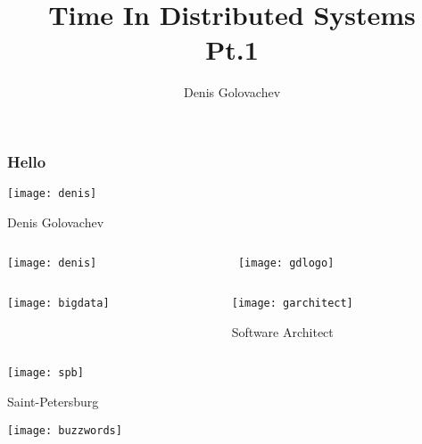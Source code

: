 \documentclass[aspectratio=169, 15pt,usenames,dvipsnames]{beamer}
\title{Time In Distributed Systems\\Pt.1}
\author{Denis Golovachev}
\begin{document}
   
	\addtolength{\textheight}{-12pt}
	\begin{titlePage}
		\titlepage        
	\end{titlePage}		
	\begin{gdblank}
		\frametitle{Hello}
		\centering\texttt{[image: denis]}
		\par\LARGE
		Denis Golovachev
	\end{gdblank} 
	\begin{gdblank}
		\begin{columns}
			\begin{column}{0.5\textwidth}
				\centering\texttt{[image: denis]}
			\end{column}
			\begin{column}{0.5\textwidth}
				\centering\texttt{[image: gdlogo]}
			\end{column}
		\end{columns}   		
	\end{gdblank}
	\begin{gdblank}
		\begin{columns}
			\begin{column}{0.5\textwidth}
				\centering\texttt{[image: bigdata]}
			\end{column}
			\begin{column}{0.5\textwidth}
				\centering\texttt{[image: garchitect]}
				\par\LARGE
				Software Architect
			\end{column}
		\end{columns}   		
	\end{gdblank}
	\begin{gdblank}
		\centering\texttt{[image: spb]}
		\par\LARGE
		Saint-Petersburg
	\end{gdblank}
	\begin{gdblank}
		\centering\texttt{[image: buzzwords]}
	\end{gdblank}	
\end{document}
